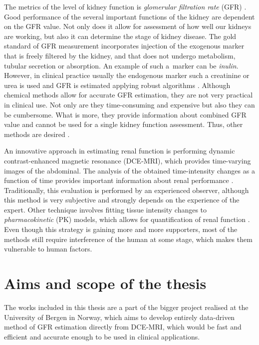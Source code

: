 The metrics of the level of kidney function is \textit{glomerular filtration rate} (GFR) \cite{traynor2006measure}. Good performance of the several important functions of the kidney are dependent on the GFR value. Not only does it allow for assessment of how well our kidneys are working, but also it can determine the stage of kidney disease.
The gold standard of GFR measurement incorporates injection of the exogenous marker that is freely filtered by the kidney, and that does not undergo metabolism, tubular secretion or absorption. An example of such a~marker can be \textit{inulin}.
However, in clinical practice usually the endogenous marker such a creatinine or urea is used and GFR is estimated applying robust algorithms \cite{delanaye2012measuring}.
Although chemical methods allow for accurate GFR estimation, they are not very practical in clinical use. Not only are they time-consuming and expensive but also they can be cumbersome. What is more, they provide information about combined GFR value and cannot be used for a single kidney function assessment. Thus, other methods are desired \cite{bokacheva2008assessment}.

An innovative approach in estimating renal function is performing dynamic contrast-enhanced magnetic resonance (DCE-MRI), which provides time-varying images of the abdominal.
The analysis of the obtained time-intensity changes as a function of time provides important information about renal performance \cite{bokacheva2008assessment, khalifa2014models}. Traditionally, this evaluation is performed by an experienced observer, although this method is very subjective and strongly depends on the experience of the expert. Other technique involves fitting tissue intensity changes to \textit{pharmacokinetic} (PK) models, which allows for quantification of renal function \cite{khalifa2014models}. Even though this strategy is gaining more and more supporters, most of the methods still require interference of the human at some stage, which makes them vulnerable to human factors. 

\section{Aims and scope of the thesis}
The works included in this thesis are a part of the bigger project realised at the University of Bergen in Norway, which aims to develop entirely data-driven method of GFR estimation directly from DCE-MRI, which would be fast and efficient and accurate enough to be used in clinical applications.  
 
